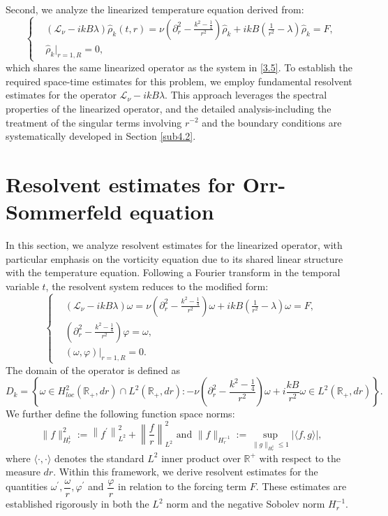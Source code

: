 \documentclass[final, 12pt,reqno]{amsart}
\numberwithin{equation}{section}
\begin{document}
Second, we analyze the linearized temperature equation derived from:
\begin{equation}\label{3.6}
    \left\{
    \begin{aligned}
        &(\mathcal{L}_\nu-ikB\lambda)\hat{\rho}_k(t,r)=\nu\left(\partial_r^2-\frac{k^2-\frac{1}{4}}{r^2}\right) \hat{\rho}_k+i k B(\frac{1}{r^2} -\lambda)\hat{\rho}_k =F,\\
        &\hat{\rho}_k|_{r=1, R}=0,
    \end{aligned}
    \right.
\end{equation}
which shares the same linearized operator as the system in
\eqref{3.5}. To establish the required space-time estimates for this
problem, we employ fundamental resolvent estimates for the operator
$\mathcal{L}_\nu-ikB\lambda$. This approach leverages the spectral
properties of the linearized operator, and the detailed
analysis-including the treatment of the singular terms involving
$r^{-2}$ and the boundary conditions are systematically developed in
Section \ref{sub4.2}.
\section{ Resolvent estimates for Orr-Sommerfeld equation}
In this section, we analyze resolvent estimates for the linearized operator, with particular emphasis on the vorticity equation due to its shared linear structure with the temperature equation. Following a Fourier transform in the temporal variable $t$, the resolvent system reduces to the modified form:
\begin{equation}\label{4.1}
    \left\{
    \begin{aligned}
        &(\mathcal{L}_\nu-ikB\lambda)\omega=\nu\left(\partial_r^2-\frac{k^2-\frac{1}{4}}{r^2}\right) \omega+i k B(\frac{1}{r^2} -\lambda)\omega =F,\\
        &   \left(\partial_r^2-\frac{k^2-\frac{1}{4}}{r^2}\right)  \varphi=\omega,\\
        &   \left. (\omega,\varphi)\right|_{r=1, R}=0.\
    \end{aligned}
    \right.
\end{equation}
The domain of the operator is defined as
{\small$$
D_k=
    \left\{\omega\in H_{l o c}^2\left(\mathbb{R}_{+}, d r\right) \cap L^2\left(\mathbb{R}_{+}, d r\right):-\nu\left(\partial_r^2-\frac{k^2-\frac{1}{4}}{r^2}\right) \omega+i \frac{k B}{r^2} \omega\in L^2\left(\mathbb{R}_{+}, d r\right)\right\}.
$$}
We further define the following function space norms:
$$
\|f\|_{H_r^1}^2:=\left\|f^{\prime}\right\|_{L^2}^2+\left\|\frac{f}{r}\right\|_{L^2}^2 \text { and }\|f\|_{H_r^{-1}}:=\sup _{\|g\|_{H_r^1} \leq 1}|\langle f, g\rangle|,
$$
where $\langle\cdot,\cdot \rangle$ denotes the standard $L^2$ inner product over $\mathbb{R}^{+}$ with respect to the measure $dr$. Within this framework, we derive resolvent estimates for the quantities $\omega^{\prime}, \dfrac{\omega}{r}, \varphi^{\prime}$ and $\dfrac{\varphi}{r}$ in relation to the forcing term $F$. These estimates are established rigorously in both the $L^2$ norm and the negative Sobolev norm $H_r^{-1}$.
\end{document}
